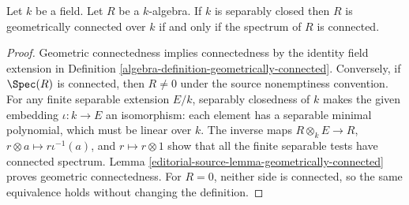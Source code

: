 \begin{lemma}
\label{editorial-source-lemma-separably-closed-connected-implies-geometric}
Let $k$ be a field.
Let $R$ be a $k$-algebra.
If $k$ is separably closed then $R$ is
geometrically connected over $k$ if and only if the
spectrum of $R$ is connected.
\end{lemma}

\begin{proof}
Geometric connectedness implies
connectedness by the identity field
extension in Definition
\ref{algebra-definition-geometrically-connected}.
Conversely, if $\Spec(R)$ is
connected, then $R\neq0$ under
the source nonemptiness convention.
For any finite separable extension
$E/k$, separably closedness of $k$
makes the given embedding $\iota:k\to E$
an isomorphism: each element has
a separable minimal polynomial,
which must be linear over $k$.
The inverse maps
$R\otimes_k E\to R$, $r\otimes a\mapsto r\iota^{-1}(a)$,
and $r\mapsto r\otimes1$ show
that all the finite separable
tests have connected spectrum.
Lemma \ref{editorial-source-lemma-geometrically-connected}
proves geometric connectedness.
For $R=0$, neither side is
connected, so the same equivalence
holds without changing the definition.
\end{proof}